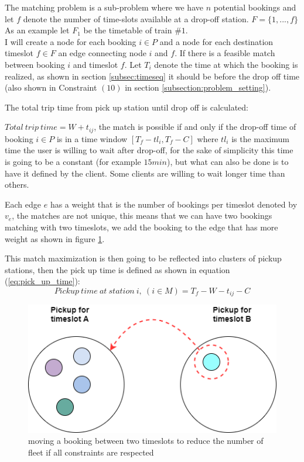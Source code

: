 \documentclass{article}
\begin{document}
The matching problem is a sub-problem where we have $n$ potential bookings and let $f$ denote the number of time-slots available at a drop-off station. $F = \{ 1, ..., f \}$ As an example let $F_1$ be the timetable of train $\#1$.\\
I will create a node for each booking $i \in P$ and a node for each destination timeslot $f \in F$ an edge connecting node $i$ and $f$. If there is a feasible match between booking $i$ and timeslot $f$. 
Let $T_i$ denote the time at which the booking is realized, as shown in section \ref{subsec:timeseq} it should be before the drop off time (also shown in Constraint $(10)$ in section \ref{subsection:problem_setting}).

The total trip time from pick up station until drop off is calculated:
 
\noindent$Total\ trip\ time = W + t_{ij} $, the match is possible if and only if the drop-off time of booking $i \in P$ is in a time window $[T_f - tl_i,T_f - C ]$ where
$tl_i$ is the maximum time the user is willing to wait after drop-off, for the sake of simplicity this time is going to be a constant (for example $15min$), but what can also be done is to have it defined by the client. Some clients are willing to
wait longer time than others.

Each edge $e$ has a weight that is the number of bookings per timeslot denoted by $v_e$, the matches are not unique, this means that we can have two bookings matching with two timeslots, we add the booking to the edge that has more weight as shown in figure \ref{fig:timelsot}.


This match maximization is then going to be reflected into clusters of pickup stations, then the pick up time is defined as shown in equation (\ref{eq:pick_up_time}):
\begin{equation}
\label{eq:pick_up_time}
Pickup \ time \ at \ station\ i, \ (i \in M) = T_f - W - t_{ij} - C
\end{equation}


\begin{figure}[H]
    \centering 
  \includegraphics[width=0.7\linewidth]{pictures/Timeslot}
  \caption{moving a booking between two timeslots to reduce the number of fleet if all constraints are respected}
\label{fig:timelsot}
\end{figure}
\end{document}
